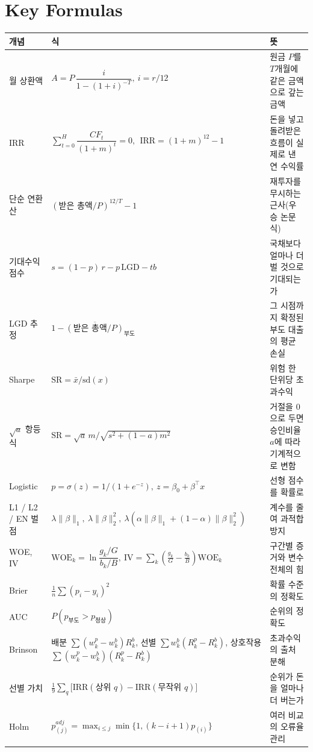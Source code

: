 \chapter*{Key Formulas}
{\small
\begin{longtable}{@{}p{34mm}p{58mm}p{60mm}@{}}\toprule
개념 & 식 & 뜻\\\midrule\endhead
월 상환액 & $A = P\,\dfrac{i}{1-(1+i)^{-T}},\ i=r/12$ & 원금 $P$를 $T$개월에 같은 금액으로 갚는 금액\\[2mm]
IRR & $\sum_{t=0}^{H} \dfrac{CF_t}{(1+m)^t}=0,\ \ \mathrm{IRR}=(1+m)^{12}-1$ & 돈을 넣고 돌려받은 흐름이 실제로 낸 연 수익률\\[2mm]
단순 연환산 & $(\text{받은 총액}/P)^{12/T}-1$ & 재투자를 무시하는 근사(우승 논문식)\\
기대수익 점수 & $s=(1-p)\,r-p\,\mathrm{LGD}-tb$ & 국채보다 얼마나 더 벌 것으로 기대되는가\\
LGD 추정 & $1-\overline{(\text{받은 총액}/P)}_{\text{부도}}$ & 그 시점까지 확정된 부도 대출의 평균 손실\\
Sharpe & $\mathrm{SR}=\bar{x}/\mathrm{sd}(x)$ & 위험 한 단위당 초과수익\\
$\sqrt{a}$ 항등식 & $\mathrm{SR}=\sqrt{a}\,m/\sqrt{s^2+(1-a)m^2}$ & 거절을 0으로 두면 승인비율 $a$에 따라 기계적으로 변함\\
Logistic & $p=\sigma(z)=1/(1+e^{-z}),\ z=\beta_0+\beta^\top x$ & 선형 점수를 확률로\\
L1 / L2 / EN 벌점 & $\lambda\|\beta\|_1,\ \lambda\|\beta\|_2^2,\ \lambda(\alpha\|\beta\|_1+(1-\alpha)\|\beta\|_2^2)$ & 계수를 줄여 과적합 방지\\
WOE, IV & $\mathrm{WOE}_k=\ln\dfrac{g_k/G}{b_k/B},\ \mathrm{IV}=\sum_k(\tfrac{g_k}{G}-\tfrac{b_k}{B})\mathrm{WOE}_k$ & 구간별 증거와 변수 전체의 힘\\[2mm]
Brier & $\frac1n\sum(p_i-y_i)^2$ & 확률 수준의 정확도\\
AUC & $P(p_{\text{부도}}>p_{\text{정상}})$ & 순위의 정확도\\
Brinson & 배분 $\sum(w^p_k-w^b_k)R^b_k$, 선별 $\sum w^b_k(R^p_k-R^b_k)$, 상호작용 $\sum(w^p_k-w^b_k)(R^p_k-R^b_k)$ & 초과수익의 출처 분해\\
선별 가치 & $\frac{1}{9}\sum_{q}\big[\mathrm{IRR}(\text{상위 }q)-\mathrm{IRR}(\text{무작위 }q)\big]$ & 순위가 돈을 얼마나 더 버는가\\
Holm & $p_{(j)}^{adj}=\max_{i\le j}\min\{1,(k-i+1)p_{(i)}\}$ & 여러 비교의 오류율 관리\\\bottomrule
\end{longtable}}

